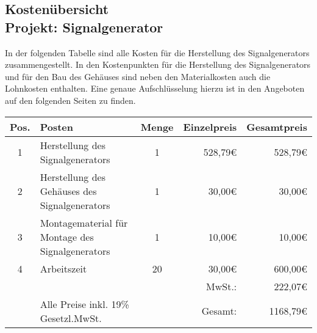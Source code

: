 \documentclass[a4paper,12pt]{article}
\begin{document}
\begin{center}
\section*{Kostenübersicht \\ Projekt: Signalgenerator}
\end{center}
In der folgenden Tabelle sind alle Kosten für die Herstellung des Signalgenerators zusammengestellt. In den Kostenpunkten für die Herstellung des Signalgenerators und für den Bau des Gehäuses sind neben den Materialkosten auch die Lohnkosten enthalten. Eine genaue Aufschlüsselung hierzu ist in den Angeboten auf den folgenden Seiten zu finden.
\bigskip
\begin{center}

\begin{tabular}{cp{7cm}cr|r|}
\hline
\multicolumn{1}{|l|}{Pos.} & \multicolumn{1}{l|}{Posten} & \multicolumn{1}{l|}{Menge} & Einzelpreis & Gesamtpreis \\ \hline
\multicolumn{1}{|c|}{1} & \multicolumn{1}{l|}{Herstellung des Signalgenerators} & \multicolumn{1}{c|}{1} & 528,79\euro & 528,79\euro \\ \hline
\multicolumn{1}{|c|}{2} & \multicolumn{1}{l|}{Herstellung des Gehäuses des Signalgenerators} & \multicolumn{1}{c|}{1} & 30,00\euro & 30,00\euro \\ \hline
\multicolumn{1}{|c|}{3} & \multicolumn{1}{l|}{Montagematerial für Montage des Signalgenerators} & \multicolumn{1}{c|}{1} & 10,00\euro & 10,00\euro \\ \hline
\multicolumn{1}{|c|}{4} & \multicolumn{1}{l|}{Arbeitszeit} & \multicolumn{1}{c|}{20} & 30,00\euro & 600,00\euro \\ \hline
 & & & MwSt.: & 222,07\euro \\ \cline{5-5}
                        & Alle Preise inkl. 19\% Gesetzl.MwSt. &                       & Gesamt: & 1168,79\euro \\ \cline{5-5} 
\end{tabular}

\end{center}
\end{document}
